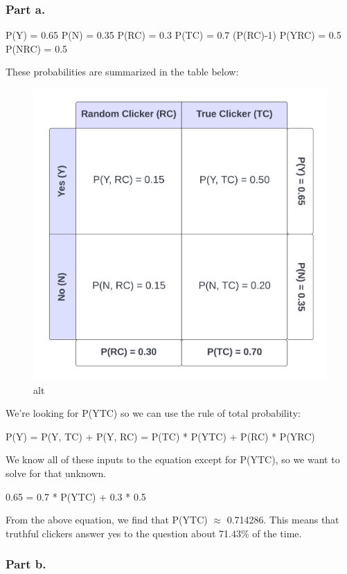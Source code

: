 \documentclass[
]{article}
\begin{document}
\hypertarget{part-a.}{%
\subsubsection{Part a.}\label{part-a.}}

P(Y) = 0.65 P(N) = 0.35 P(RC) = 0.3 P(TC) = 0.7 (P(RC)-1)
P(Y\textbar RC) = 0.5 P(N\textbar RC) = 0.5

These probabilities are summarized in the table below:

\begin{figure}
\centering
\includegraphics{Table.png}
\caption{alt}
\end{figure}

We're looking for P(Y\textbar TC) so we can use the rule of total
probability:

P(Y) = P(Y, TC) + P(Y, RC) = P(TC) * P(Y\textbar TC) + P(RC) *
P(Y\textbar RC)

We know all of these inputs to the equation except for P(Y\textbar TC),
so we want to solve for that unknown.

0.65 = 0.7 * P(Y\textbar TC) + 0.3 * 0.5

From the above equation, we find that P(Y\textbar TC) \(\approx\)
0.714286. This means that truthful clickers answer yes to the question
about 71.43\% of the time.

\hypertarget{part-b.}{%
\subsubsection{Part b.}\label{part-b.}}
\end{document}
